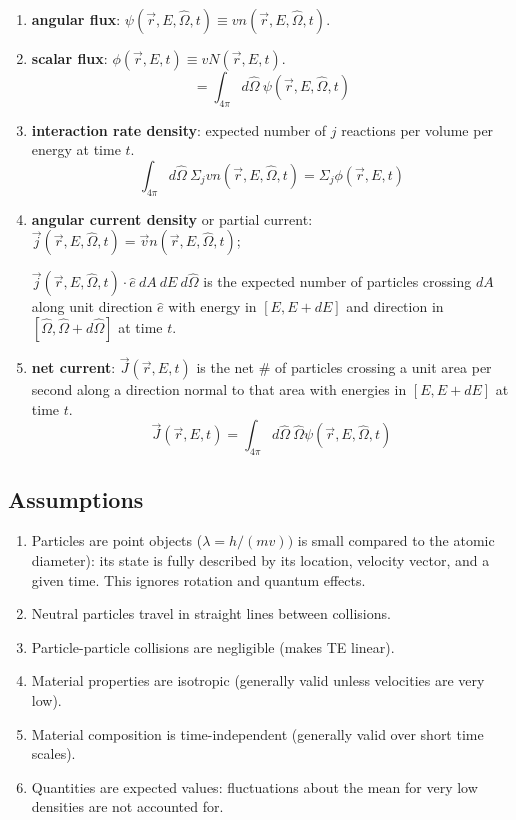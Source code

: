 \documentclass[12pt]{article}
\newcommand{\vOmega}{\ensuremath{\hat{\Omega}}}
\begin{document}
\begin{enumerate}
\item \textbf{angular flux}: $\psi(\vec{r}, E, \vOmega, t) \equiv v n(\vec{r}, E, \vOmega, t)$.

\item \textbf{scalar flux}: $\phi(\vec{r},E,t) \equiv v N(\vec{r},E,t)$.
%
\[= \int_{4\pi} d\vOmega\: \psi(\vec{r}, E, \vOmega, t) \]

\item \textbf{interaction rate density}: expected number of $j$ reactions per volume per energy at time $t$.
%
\[\int_{4\pi} d\vOmega \:\Sigma_j v n(\vec{r}, E, \vOmega, t) = \Sigma_j \phi(\vec{r},E,t)\]

\item \textbf{angular current density} or partial current: $\vec{j}(\vec{r}, E, \vOmega, t) = \vec{v} n(\vec{r}, E, \vOmega, t)$; 

$\vec{j}(\vec{r}, E, \vOmega, t) \cdot \hat{e}\: dA\: dE\: d\vOmega$ is the expected number of particles crossing $dA$ along unit direction $\hat{e}$ with energy in $[E, E + dE]$ and direction in $[\vOmega, \vOmega + d\vOmega]$ at time $t$.

\item \textbf{net current}: $\vec{J}(\vec{r}, E, t) $ is the net \# of particles crossing a unit area per second along a direction normal to that area with energies in $[E, E + dE]$ at time $t$.
\[\vec{J}(\vec{r}, E, t) = \int_{4\pi} d\vOmega\: \vOmega \psi(\vec{r}, E, \vOmega, t)\]

\end{enumerate}

\subsection*{Assumptions}
\begin{enumerate}
\item Particles are point objects ($\lambda = h/(mv))$ is small compared to the atomic diameter): its state is fully described by its location, velocity vector, and a given time. This ignores rotation and quantum effects.

\item Neutral particles travel in straight lines between collisions.

\item Particle-particle collisions are negligible (makes TE linear).

\item Material properties are isotropic (generally valid unless velocities are very low).

\item Material composition is time-independent (generally valid over short time scales).

\item Quantities are expected values: fluctuations about the mean for very low densities are not accounted for.
\end{enumerate}
\end{document}
